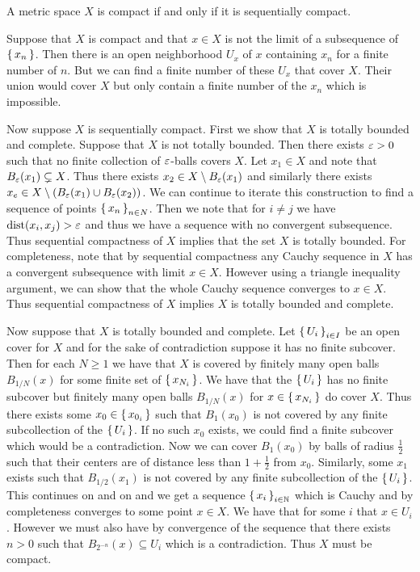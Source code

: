 \documentclass[letterpaper, 11pt, oneside]{book}
\begin{document}
\clearpage

\begin{prop}
  A metric space $X$ is compact if and only if it is sequentially compact.
\end{prop}
\begin{pf}
  Suppose that $X$ is compact and that $x \in X$ is not the limit of a subsequence of $\set{x_{n}}$.
  Then there is an open neighborhood $U_{x}$ of $x$ containing $x_{n}$ for a finite number of $n$.
  But we can find a finite number of these $U_{x}$ that cover $X$.
  Their union would cover $X$ but only contain a finite number of the $x_{n}$ which is impossible.

  Now suppose $X$ is sequentially compact.
  First we show that $X$ is totally bounded and complete.
  Suppose that $X$ is not totally bounded.
  Then there exists $\varepsilon > 0$ such that no finite collection of $\varepsilon$-balls covers $X$.
  Let $x_{1} \in X$ and note that $B_{\varepsilon}(x_{1}) \subsetneq X$.
  Thus there exists $x_{2} \in X \setminus B_{\varepsilon}(x_{1})$ and similarly there exists $x_{e} \in X \setminus (B_{\varepsilon}(x_{1}) \cup B_{\varepsilon}(x_{2}))$.
  We can continue to iterate this construction to find a sequence of points $\set{x_{n}}_{n \in N}$.
  Then we note that for $i \neq j$ we have $\operatorname{dist}(x_{i}, x_{j}) > \varepsilon$ and thus we have a sequence with no convergent subsequence.
  Thus sequential compactness of $X$ implies that the set $X$ is totally bounded.
  For completeness, note that by sequential compactness any Cauchy sequence in $X$ has a convergent subsequence with limit $x \in X$.
  However using a triangle inequality argument, we can show that the whole Cauchy sequence converges to $x \in X$.
  Thus sequential compactness of $X$ implies $X$ is totally bounded and complete.

  Now suppose that $X$ is totally bounded and complete.
  Let $\set{U_{i}}_{i \in I}$ be an open cover for $X$ and for the sake of contradiction suppose it has no finite subcover.
  Then for each $N \geq 1$ we have that $X$ is covered by finitely many open balls $B_{1 / N}(x)$ for some finite set of $\set{x_{N_{i}}}$.
  We have that the $\set{U_{i}}$ has no finite subcover but finitely many open balls $B_{1 / N}(x)$ for $x \in \set{x_{N_{i}}}$ do cover $X$.
  Thus there exists some $x_{0} \in \set{x_{0_{i}}}$ such that $B_{1}(x_{0})$ is not covered by any finite subcollection of the $\set{U_{i}}$.
  If no such $x_{0}$ exists, we could find a finite subcover which would be a contradiction.
  Now we can cover $B_{1}(x_{0})$ by balls of radius $\frac{1}{2}$ such that their centers are of distance less than $1 + \frac{1}{2}$ from $x_{0}$.
  Similarly, some $x_{1}$ exists such that $B_{1/2}(x_{1})$ is not covered by any finite subcollection of the $\set{U_{i}}$.
  This continues on and on and we get a sequence $\set{x_{i}}_{i \in \mathbb{N}}$ which is Cauchy and by completeness converges to some point $x \in X$.
  We have that for some $i$ that $x \in U_{i}$.
  However we must also have by convergence of the sequence that there exists $n > 0$ such that $B_{2^{-n}}(x) \subseteq U_{i}$ which is a contradiction.
  Thus $X$ must be compact.
\end{pf}
\end{document}
